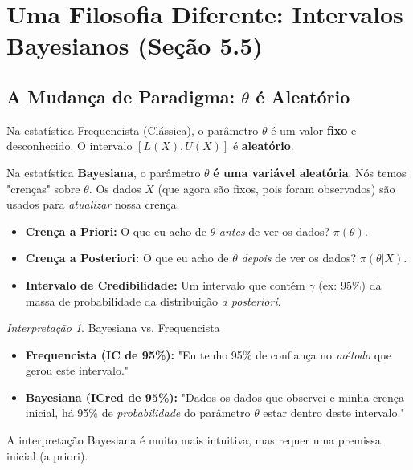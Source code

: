 \documentclass[12pt, a4paper]{article}
\theoremstyle{definition} %
\theoremstyle{remark} %
\newtheorem{interpretacao}{Interpretação}[section]
\begin{document}
\section{Uma Filosofia Diferente: Intervalos Bayesianos (Seção 5.5)}

\subsection{A Mudança de Paradigma: $\theta$ é Aleatório}
Na estatística Frequencista (Clássica), o parâmetro $\theta$ é um valor \textbf{fixo} e desconhecido. O intervalo $[L(X), U(X)]$ é \textbf{aleatório}.

Na estatística \textbf{Bayesiana}, o parâmetro $\theta$ \textbf{é uma variável aleatória}. Nós temos "crenças" sobre $\theta$. Os dados $X$ (que agora são fixos, pois foram observados) são usados para \textit{atualizar} nossa crença.

\begin{itemize}
    \item \textbf{Crença a Priori:} O que eu acho de $\theta$ \textit{antes} de ver os dados? $\pi(\theta)$.
    \item \textbf{Crença a Posteriori:} O que eu acho de $\theta$ \textit{depois} de ver os dados? $\pi(\theta | X)$.
    \item \textbf{Intervalo de Credibilidade:} Um intervalo que contém $\gamma$ (ex: 95\%) da massa de probabilidade da distribuição \textit{a posteriori}.
\end{itemize}

\begin{interpretacao}{Bayesiana vs. Frequencista}
    \begin{itemize}
        \item \textbf{Frequencista (IC de 95\%):} "Eu tenho 95\% de confiança no \textit{método} que gerou este intervalo."
        \item \textbf{Bayesiana (ICred de 95\%):} "Dados os dados que observei e minha crença inicial, há 95\% de \textit{probabilidade} do parâmetro $\theta$ estar dentro deste intervalo."
    \end{itemize}
    A interpretação Bayesiana é muito mais intuitiva, mas requer uma premissa inicial (a priori).
\end{interpretacao}
\end{document}
